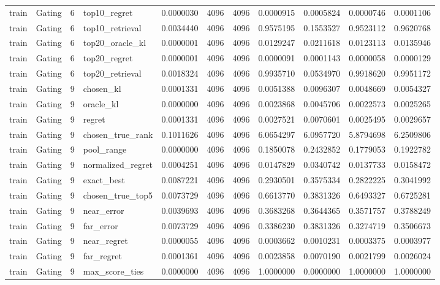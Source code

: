 \begin{tabular}{llrlrrrrrrr}
train & Gating & 6 & top10_regret & 0.0000030 & 4096 & 4096 & 0.0000915 & 0.0005824 & 0.0000746 & 0.0001106 \\
train & Gating & 6 & top10_retrieval & 0.0034440 & 4096 & 4096 & 0.9575195 & 0.1553527 & 0.9523112 & 0.9620768 \\
train & Gating & 6 & top20_oracle_kl & 0.0000001 & 4096 & 4096 & 0.0129247 & 0.0211618 & 0.0123113 & 0.0135946 \\
train & Gating & 6 & top20_regret & 0.0000001 & 4096 & 4096 & 0.0000091 & 0.0001143 & 0.0000058 & 0.0000129 \\
train & Gating & 6 & top20_retrieval & 0.0018324 & 4096 & 4096 & 0.9935710 & 0.0534970 & 0.9918620 & 0.9951172 \\
train & Gating & 9 & chosen_kl & 0.0001331 & 4096 & 4096 & 0.0051388 & 0.0096307 & 0.0048669 & 0.0054327 \\
train & Gating & 9 & oracle_kl & 0.0000000 & 4096 & 4096 & 0.0023868 & 0.0045706 & 0.0022573 & 0.0025265 \\
train & Gating & 9 & regret & 0.0001331 & 4096 & 4096 & 0.0027521 & 0.0070601 & 0.0025495 & 0.0029657 \\
train & Gating & 9 & chosen_true_rank & 0.1011626 & 4096 & 4096 & 6.0654297 & 6.0957720 & 5.8794698 & 6.2509806 \\
train & Gating & 9 & pool_range & 0.0000000 & 4096 & 4096 & 0.1850078 & 0.2432852 & 0.1779053 & 0.1922782 \\
train & Gating & 9 & normalized_regret & 0.0004251 & 4096 & 4096 & 0.0147829 & 0.0340742 & 0.0137733 & 0.0158472 \\
train & Gating & 9 & exact_best & 0.0087221 & 4096 & 4096 & 0.2930501 & 0.3575334 & 0.2822225 & 0.3041992 \\
train & Gating & 9 & chosen_true_top5 & 0.0073729 & 4096 & 4096 & 0.6613770 & 0.3831326 & 0.6493327 & 0.6725281 \\
train & Gating & 9 & near_error & 0.0039693 & 4096 & 4096 & 0.3683268 & 0.3644365 & 0.3571757 & 0.3788249 \\
train & Gating & 9 & far_error & 0.0073729 & 4096 & 4096 & 0.3386230 & 0.3831326 & 0.3274719 & 0.3506673 \\
train & Gating & 9 & near_regret & 0.0000055 & 4096 & 4096 & 0.0003662 & 0.0010231 & 0.0003375 & 0.0003977 \\
train & Gating & 9 & far_regret & 0.0001361 & 4096 & 4096 & 0.0023858 & 0.0070190 & 0.0021799 & 0.0026024 \\
train & Gating & 9 & max_score_ties & 0.0000000 & 4096 & 4096 & 1.0000000 & 0.0000000 & 1.0000000 & 1.0000000 \\

\end{tabular}
